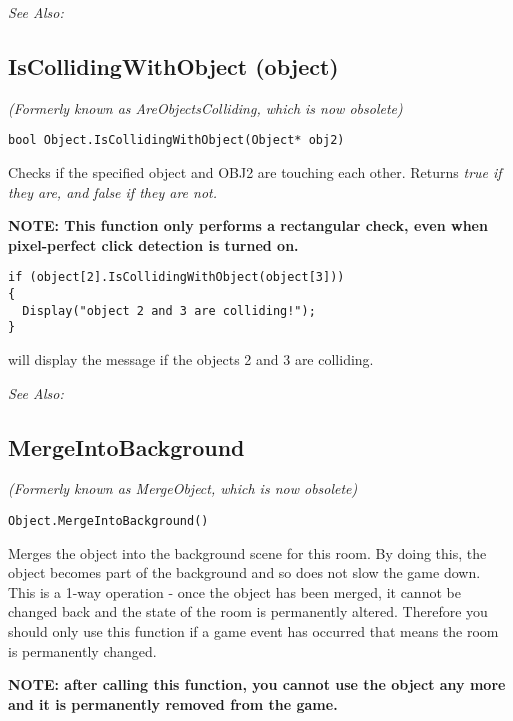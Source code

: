 \it{See Also:} 


\subsection{IsCollidingWithObject (object)}\label{Object.IsCollidingWithObject}%

\it{(Formerly known as AreObjectsColliding, which is now obsolete)}

\begin{verbatim}
bool Object.IsCollidingWithObject(Object* obj2)
\end{verbatim}
Checks if the specified object and OBJ2 are touching each other. Returns \it{true} if they
are, and \it{false} if they are not.

\bf{NOTE:} This function only performs a rectangular check, even when pixel-perfect
click detection is turned on.

\begin{verbatim}
if (object[2].IsCollidingWithObject(object[3]))
{
  Display("object 2 and 3 are colliding!");
}
\end{verbatim}
will display the message if the objects 2 and 3 are colliding.

\it{See Also:} 


\subsection{MergeIntoBackground}\label{Object.MergeIntoBackground}%

\it{(Formerly known as MergeObject, which is now obsolete)}

\begin{verbatim}
Object.MergeIntoBackground()
\end{verbatim}
Merges the object into the background scene for this room.
By doing this, the object becomes part of the background and so does not
slow the game down. This is a 1-way operation - once the object has
been merged, it cannot be changed back and the state of the room is
permanently altered. Therefore you should only use this function if a game
event has occurred that means the room is permanently changed.

\bf{NOTE:} after calling this function, you cannot use the object any more and
it is permanently removed from the game.

